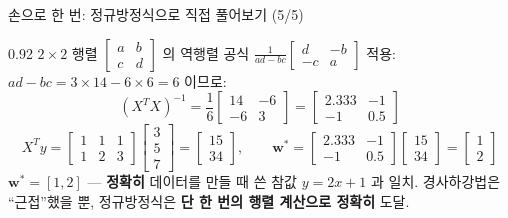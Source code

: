 \begin{frame}{손으로 한 번: 정규방정식으로 직접 풀어보기 (5/5)}
\begin{center}\begin{varwidth}{0.92\textwidth}
  $2 \times 2$ 행렬 $\begin{bmatrix}a&b\\c&d\end{bmatrix}$ 의
  역행렬 공식 $\frac{1}{ad-bc}\begin{bmatrix}d&-b\\-c&a\end{bmatrix}$
  적용: $ad-bc = 3\times14-6\times6 = 6$ 이므로:
  \[
  (X^TX)^{-1} = \frac{1}{6}\begin{bmatrix}14&-6\\-6&3\end{bmatrix}
  = \begin{bmatrix}2.333&-1\\-1&0.5\end{bmatrix}
  \]
  \[
  X^Ty = \begin{bmatrix}1&1&1\\1&2&3\end{bmatrix}
  \begin{bmatrix}3\\5\\7\end{bmatrix}
  = \begin{bmatrix}15\\34\end{bmatrix}, \hspace{2em}
  \boldsymbol{w}^{*} = \begin{bmatrix}2.333&-1\\-1&0.5\end{bmatrix}
  \begin{bmatrix}15\\34\end{bmatrix}
  = \begin{bmatrix}1\\2\end{bmatrix}
  \]
  $\boldsymbol{w}^{*} = [1, 2]$ --- \textbf{정확히} 데이터를 만들 때 쓴 참값
  $y = 2x+1$ 과 일치. 경사하강법은 ``근접''했을 뿐, 정규방정식은
  \textbf{단 한 번의 행렬 계산으로 정확히} 도달.
\end{varwidth}\end{center}
\end{frame}
